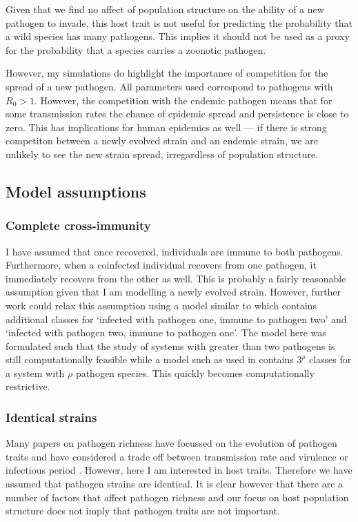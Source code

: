 Given that we find no affect of population structure on the ability of a new pathogen to invade, this host trait is not useful for predicting the probability that a wild species has many pathogens.
This implies it should not be used as a proxy for the probability that a species carries a zoonotic pathogen.

However, my simulations do highlight the importance of competition for the spread of a new pathogen.
All parameters used correspond to pathogens with $R_0>1$.
However, the competition with the endemic pathogen means that for some transmission rates the chance of epidemic spread and persistence is close to zero.
This has implications for human epidemics as well --- if there is strong competiton between a newly evolved strain and an endemic strain, we are unlikely to see the new strain spread, irregardless of population structure.




\subsection{Model assumptions}

\subsubsection{Complete cross-immunity}

I have assumed that once recovered, individuals are immune to both pathogens. 
Furthermore, when a coinfected individual recovers from one pathogen, it immediately recovers from the other as well.
This is probably a fairly reasonable assumption given that I am modelling a newly evolved strain.
However, further work could relax this assumption using a model similar to \cite{poletto2015characterising} which contains additional classes for `infected with pathogen one, immune to pathogen two' and `infected with pathogen two, immune to pathogen one'.
The model here was formulated such that the study of systems with greater than two pathogens is still computationally feasible while a model such as used in \cite{poletto2015characterising} contains $3^\rho$ classes for a system with $\rho$ pathogen species.
This quickly becomes computationally restrictive.

\subsubsection{Identical strains}

Many papers on pathogen richness have focussed on the evolution of pathogen traits and have considered a trade off between transmission rate and virulence \cite{nowak1994superinfection, nowak1994superinfection} or infectious period \cite{poletto2013host}.
However, here I am interested in host traits.
Therefore we have assumed that pathogen strains are identical.
It is clear however that there are a number of factors that affect pathogen richness and our focus on host population structure does not imply that pathogen traits are not important.

